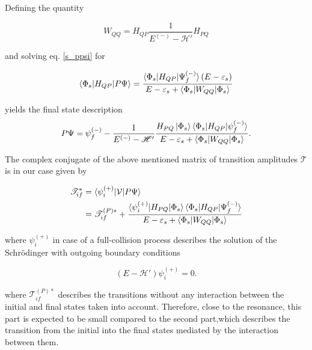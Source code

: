 Defining the quantity

\begin{equation}
  W_{QQ} = H_{QP}\frac{1}{E^{(-)} - \mathscr{H}'}H_{PQ}
\end{equation}

and solving eq. \ref{s_ppsi} for

\begin{equation}
  \braket{\Phi_s|H_{QP}|P\Psi} = \frac{\braket{\Phi_s|H_{QP}|\Psi_f^{(-)}}(E-\varepsilon_s)}
{E - \varepsilon_s + \braket{\Phi_s|W_{QQ}|\Phi_s}}
\end{equation}

yields the final state description
\begin{equation}\label{}
  P \Psi = \psi_f^{(-)} - \frac{1}{E^{(-)} - \mathscr{H}'}
           \frac{H_{PQ}\ket{\Phi_s}
           \braket{\Phi_s|H_{QP}|\psi_f^{(-)}}}
           {E - \varepsilon_s + \braket{\Phi_s|W_{QQ}|\Phi_s}} .
\end{equation}



The complex conjugate of the above mentioned matrix of transition
amplitudes $\mathcal{T}$
is in our case given by


\begin{align}
  \mathscr{T}_{if}^* &= \braket{\psi_i^{(+)}| \mathcal{V} | P\Psi} \\
                   &= \mathscr{T}_{if}^{(P)*} + 
                     \frac{\braket{\psi_i^{(+)}|H_{PQ}|\Phi_s}
                           \braket{\Phi_s|H_{QP}|\Psi_f^{(-)}}}
                          {E-\varepsilon_s + \braket{\Phi_s|W_{QQ}|\Phi_s}}
\end{align}

where $\psi_i^{(+)}$ in case of a full-collision process describes
the solution of the Schrödinger with outgoing
boundary conditions

\begin{equation}                                                              
  (E - \mathscr{H}') \psi_i^{(+)} = 0 .                                       
\end{equation}

where $\mathscr{T}_{if}^{(P)*}$ describes the transitions without any interaction
between the initial and final states taken into account. Therefore, close to   
the resonance, this part is expected to be small compared to the second part,which
describes the transition
from the initial into the final states mediated by the interaction between them.

